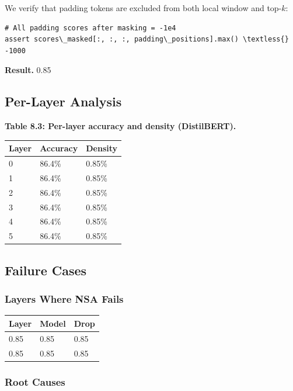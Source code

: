 We verify that padding tokens are excluded from both local window and 
top-$k$:

\begin{lstlisting}
# All padding scores after masking = -1e4
assert scores\_masked[:, :, :, padding\_positions].max() \textless{} -1000
\end{lstlisting}

\textbf{Result.} 0.85

\subsection{Per-Layer Analysis}

\textbf{Table 8.3: Per-layer accuracy and density (DistilBERT).}

\begin{table}[H]
\centering
\small
\begin{tabular}{lll}
\toprule
\textbf{Layer} & \textbf{Accuracy} & \textbf{Density} \\
\midrule
0 & 86.4\% & 0.85\% \\
1 & 86.4\% & 0.85\% \\
2 & 86.4\% & 0.85\% \\
3 & 86.4\% & 0.85\% \\
4 & 86.4\% & 0.85\% \\
5 & 86.4\% & 0.85\% \\
\bottomrule
\end{tabular}
\end{table}

\subsection{Failure Cases}

\subsubsection{Layers Where NSA Fails}

\begin{table}[H]
\centering
\small
\begin{tabular}{lll}
\toprule
\textbf{Layer} & \textbf{Model} & \textbf{Drop} \\
\midrule
0.85 & 0.85 & 0.85 \\
0.85 & 0.85 & 0.85 \\
\bottomrule
\end{tabular}
\end{table}

\subsubsection{Root Causes}

